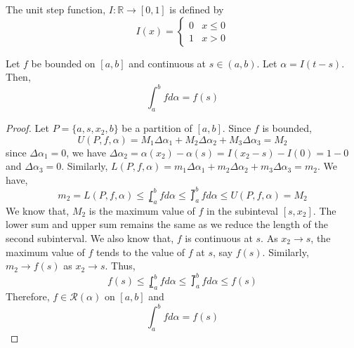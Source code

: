 \begin{definition}[step]
	The unit step function, $I : \mathbb{R} \to [0,1]$ is defined by
		\[ I(x) = \begin{cases} 0 & x \le 0 \\ 1 & x > 0 \end{cases} \]
\end{definition}

\begin{theorem}
	Let $f$ be bounded on $[a,b]$ and continuous at $s \in (a,b)$.
	Let $\alpha = I(t-s)$.
	Then,
		\[ \int_a^b f d\alpha = f(s) \]
\end{theorem}
\begin{proof}
	Let $P = \{ a,s,x_2,b \}$ be a partition of $[a,b]$.
	Since $f$ is bounded, 
		\[ U(P,f,\alpha) = M_1 \Delta\alpha_1 + M_2 \Delta \alpha_2+ M_3 \Delta\alpha_3 = M_2 \]
	since $\Delta\alpha_1 = 0$, we have $\Delta\alpha_2 = \alpha(x_2) - \alpha(s) = I(x_2-s) - I(0) = 1-0$ and $\Delta \alpha_3 = 0$.
	Similarly, $L(P,f,\alpha) = m_1\Delta\alpha_1 + m_2\Delta\alpha_2 + m_3\Delta\alpha_3 = m_2$.
	We have,
		\[ m_2 = L(P,f,\alpha) \le \lowint_a^b f d\alpha \le \upint_a^b f d\alpha \le U(P,f,\alpha) = M_2 \]
	We know that, $M_2$ is the maximum value of $f$ in the subinteval $[s,x_2]$.
	The lower sum and upper sum remains the same as we reduce the length of the second subinterval.
	We also know that, $f$ is continuous at $s$.
	As $x_2 \to s$, the maximum value of $f$ tends to the value of $f$ at $s$, say $f(s)$.
	Similarly,  $m_2 \to f(s)$ as $x_2 \to s$.
	Thus,
		\[ f(s) \le \lowint_a^b f d\alpha \le \upint_a^b f d\alpha \le f(s) \]
	Therefore, $f \in \mathscr{R}(\alpha)$ on $[a,b]$ and
		\[ \int_a^b f d\alpha = f(s) \]
\end{proof}

